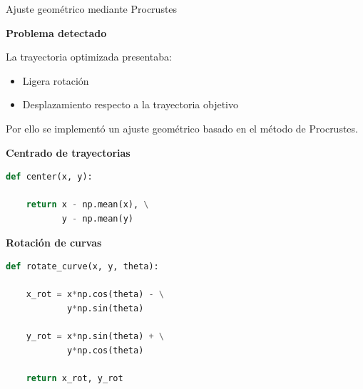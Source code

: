 \documentclass[xcolor={table,dvipsnames}]{beamer}
\begin{document}
\begin{frame}[fragile]{Ajuste geom\'etrico mediante Procrustes}
\scriptsize

\textbf{Problema detectado}

\vspace{0.2cm}

La trayectoria optimizada presentaba:

\begin{itemize}
    \item Ligera rotaci\'on
    \item Desplazamiento respecto a la trayectoria objetivo
\end{itemize}

\vspace{0.2cm}

Por ello se implement\'o un ajuste geom\'etrico basado en el m\'etodo de Procrustes.

\vspace{0.3cm}

\textbf{Centrado de trayectorias}

\begin{lstlisting}[language=Python,basicstyle=\ttfamily\tiny]
def center(x, y):

    return x - np.mean(x), \
           y - np.mean(y)
\end{lstlisting}

\vspace{0.2cm}

\textbf{Rotaci\'on de curvas}

\begin{lstlisting}[language=Python,basicstyle=\ttfamily\tiny]
def rotate_curve(x, y, theta):

    x_rot = x*np.cos(theta) - \
            y*np.sin(theta)

    y_rot = x*np.sin(theta) + \
            y*np.cos(theta)

    return x_rot, y_rot
\end{lstlisting}

\end{frame}

\end{document}
